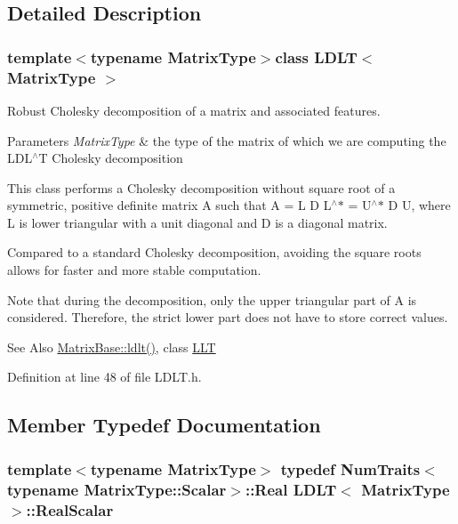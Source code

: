 \subsection{Detailed Description}
\subsubsection*{template$<$typename Matrix\-Type$>$class L\-D\-L\-T$<$ Matrix\-Type $>$}

Robust Cholesky decomposition of a matrix and associated features. 


\begin{DoxyParams}{Parameters}
{\em Matrix\-Type} & the type of the matrix of which we are computing the L\-D\-L$^\wedge$\-T Cholesky decomposition\\
\hline
\end{DoxyParams}
This class performs a Cholesky decomposition without square root of a symmetric, positive definite matrix A such that A = L D L$^\wedge$$\ast$ = U$^\wedge$$\ast$ D U, where L is lower triangular with a unit diagonal and D is a diagonal matrix.

Compared to a standard Cholesky decomposition, avoiding the square roots allows for faster and more stable computation.

Note that during the decomposition, only the upper triangular part of A is considered. Therefore, the strict lower part does not have to store correct values.

\begin{DoxySeeAlso}{See Also}
\hyperlink{class_matrix_base_ae796844a6225cfbc0de39450a791bbff}{Matrix\-Base\-::ldlt()}, class \hyperlink{class_l_l_t}{L\-L\-T} 
\end{DoxySeeAlso}


Definition at line 48 of file L\-D\-L\-T.\-h.



\subsection{Member Typedef Documentation}
\hypertarget{class_l_d_l_t_a5ef1952281688f7ff35aa4ec2ebc3bd8}{
\subsubsection[{Real\-Scalar}]{\setlength{\rightskip}{0pt plus 5cm}template$<$typename Matrix\-Type$>$ typedef {\bf Num\-Traits}$<$typename Matrix\-Type\-::\-Scalar$>$\-::Real {\bf L\-D\-L\-T}$<$ Matrix\-Type $>$\-::{\bf Real\-Scalar}}}\label{class_l_d_l_t_a5ef1952281688f7ff35aa4ec2ebc3bd8}


